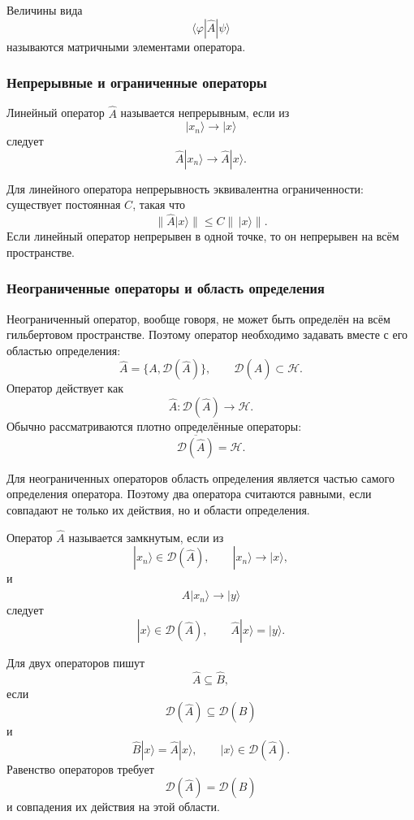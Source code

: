\documentclass[12pt,a4paper]{article}
\begin{document}
Величины вида
\[
    \langle\varphi|\hat A|\psi\rangle
\]
называются матричными элементами оператора.

\subsubsection{Непрерывные и ограниченные операторы}

Линейный оператор $\hat A$ называется непрерывным, если из
\[
    |x_n\rangle\longrightarrow|x\rangle
\]
следует
\[
    \boxed{
        \hat A|x_n\rangle
        \longrightarrow
        \hat A|x\rangle
    }.
\]

Для линейного оператора непрерывность эквивалентна ограниченности:
существует постоянная $C$, такая что
\[
    \boxed{
        \|\hat A|x\rangle\|
        \leq
        C\|\,|x\rangle\|
    }.
\]
Если линейный оператор непрерывен в одной точке, то он непрерывен на
всём пространстве.

\subsubsection{Неограниченные операторы и область определения}

Неограниченный оператор, вообще говоря, не может быть определён на
всём гильбертовом пространстве. Поэтому оператор необходимо задавать
вместе с его областью определения:
\[
    \boxed{
        \hat A
        =
        \{A,\mathcal D(\hat A)\}
    },
    \qquad
    \mathcal D(\hat A)\subset\mathcal H.
\]
Оператор действует как
\[
    \hat A:
    \mathcal D(\hat A)\to\mathcal H.
\]
Обычно рассматриваются плотно определённые операторы:
\[
    \boxed{
        \overline{\mathcal D(\hat A)}
        =
        \mathcal H
    }.
\]

Для неограниченных операторов область определения является частью
самого определения оператора. Поэтому два оператора считаются равными,
если совпадают не только их действия, но и области определения.

Оператор $\hat A$ называется замкнутым, если из
\[
    |x_n\rangle\in\mathcal D(\hat A),
    \qquad
    |x_n\rangle\to|x\rangle,
\]
и
\[
    \hat A|x_n\rangle\to|y\rangle
\]
следует
\[
    \boxed{
        |x\rangle\in\mathcal D(\hat A),
        \qquad
        \hat A|x\rangle=|y\rangle
    }.
\]

Для двух операторов пишут
\[
    \hat A\subseteq\hat B,
\]
если
\[
    \mathcal D(\hat A)\subseteq\mathcal D(\hat B)
\]
и
\[
    \boxed{
        \hat B|x\rangle
        =
        \hat A|x\rangle,
        \qquad
        |x\rangle\in\mathcal D(\hat A)
    }.
\]
Равенство операторов требует
\[
    \boxed{
        \mathcal D(\hat A)=\mathcal D(\hat B)
    }
\]
и совпадения их действия на этой области.
\end{document}
